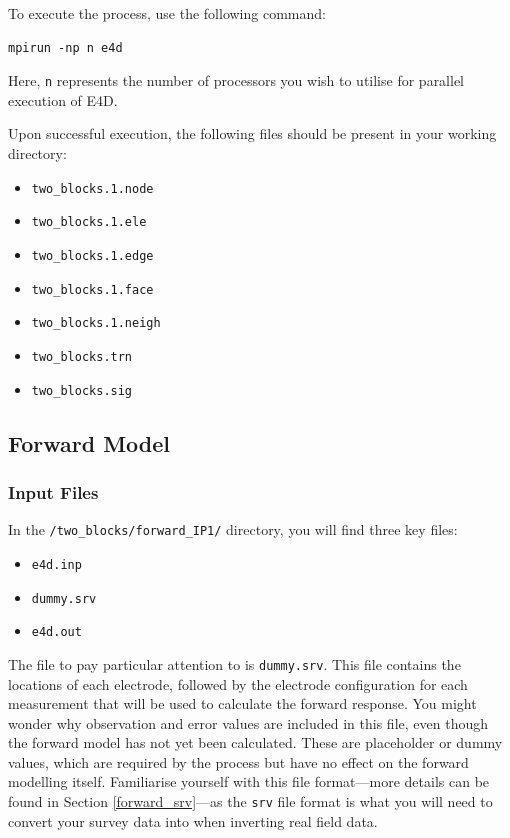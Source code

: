 \documentclass[a4paper,12pt]{article}
\begin{document}
To execute the process, use the following command:

\begin{verbatim}
mpirun -np n e4d
\end{verbatim}

Here, \texttt{n} represents the number of processors you wish to utilise for parallel execution of E4D.

Upon successful execution, the following files should be present in your working directory:

\begin{itemize}
    \item \texttt{two\_blocks.1.node}
    \item \texttt{two\_blocks.1.ele}
    \item \texttt{two\_blocks.1.edge}
    \item \texttt{two\_blocks.1.face}
    \item \texttt{two\_blocks.1.neigh}
    \item \texttt{two\_blocks.trn}
    \item \texttt{two\_blocks.sig}
\end{itemize}

\subsection{Forward Model} \label{two_blocks_forward}

\subsubsection{Input Files}

In the \texttt{/two\_blocks/forward\_IP1/} directory, you will find three key files:

\begin{itemize}
    \item \texttt{e4d.inp}
    \item \texttt{dummy.srv}
    \item \texttt{e4d.out}
\end{itemize}

The file to pay particular attention to is \texttt{dummy.srv}. This file contains the locations of each electrode, followed by the electrode configuration for each measurement that will be used to calculate the forward response. You might wonder why observation and error values are included in this file, even though the forward model has not yet been calculated. These are placeholder or dummy values, which are required by the process but have no effect on the forward modelling itself. Familiarise yourself with this file format—more details can be found in Section \ref{forward_srv}—as the \texttt{srv} file format is what you will need to convert your survey data into when inverting real field data. 
\end{document}
